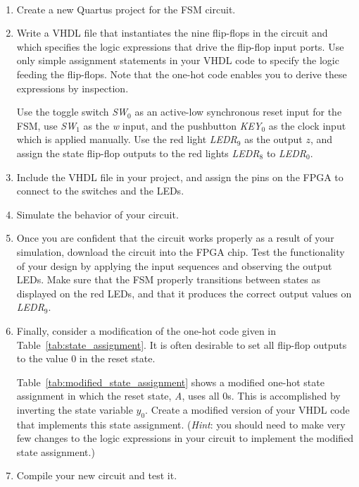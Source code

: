 \documentclass[epsfig,10pt,fullpage]{article}
\begin{document}
\begin{enumerate}
\item Create a new Quartus\textsuperscript{\textregistered} project for the FSM circuit. 

\item Write a VHDL file that instantiates the nine flip-flops in the circuit and which
specifies the logic expressions that drive the flip-flop input ports. Use only
simple assignment statements in your VHDL code to specify the logic feeding the
flip-flops. Note that the one-hot code enables you to derive these expressions by
inspection.

Use the toggle switch {\it SW}$_0$ as an active-low synchronous reset input
for the FSM, use {\it SW}$_1$ as the {\it w} input, and the pushbutton {\it KEY}$_0$ as the clock input which 
is applied manually.  Use the red light {\it LEDR}$_9$ as the output $z$, 
and assign the state flip-flop outputs to the red lights {\it LEDR}$_8$ to {\it LEDR}$_0$.

\item Include the VHDL file in your project, and assign the pins on the FPGA to 
connect to the switches and the LEDs.

\item Simulate the behavior of your circuit.

\item Once you are confident that the circuit works properly as a result of your
simulation, download the circuit into the FPGA chip.  Test the functionality of your 
design by applying the input sequences and observing the output LEDs. Make sure that the
FSM properly transitions between states as displayed on the red LEDs, and that it produces
the correct output values on {\it LEDR}$_9$.

\item Finally, consider a modification of the one-hot code given in Table~\ref{tab:state_assignment}. It is often 
desirable to set all flip-flop outputs to the value 0 in the reset state.

Table~\ref{tab:modified_state_assignment} shows a modified one-hot state assignment in which the reset state, {\it A},
uses all 0s. This is accomplished by inverting the state variable $y_0$. 
Create a modified version of your VHDL code that implements this state
assignment. ({\it Hint}: you should need to make very few changes to the logic expressions
in your circuit to implement the modified state assignment.) 

\item Compile your new circuit and test it.


\end{enumerate}
\end{document}
